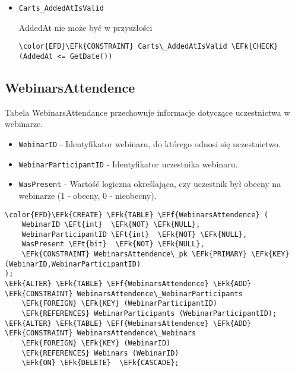 \documentclass[11pt]{article}
\newcommand{\EFk}[1]{\textcolor{EFk}{\textbf{#1}}} %
\newcommand{\EFf}[1]{\textcolor{EFf}{#1}} %
\newcommand{\EFt}[1]{\textcolor{EFt}{\textbf{#1}}} %
\begin{document}
\begin{itemize}
\item \texttt{Carts\_AddedAtIsValid}

AddedAt nie może być w przyszłości
\begin{Code}
\begin{Verbatim}
\color{EFD}\EFk{CONSTRAINT} Carts\_AddedAtIsValid \EFk{CHECK}
(AddedAt <= GetDate())
\end{Verbatim}
\end{Code}
\end{itemize}
\subsection{WebinarsAttendence}
\label{sec:org1fe8433}
Tabela WebinarsAttendance przechowuje informacje dotyczące uczestnictwa w webinarze.
\begin{itemize}
\item \texttt{WebinarID} - Identyfikator webinaru, do którego odnosi się uczestnictwo.
\item \texttt{WebinarParticipantID} - Identyfikator uczestnika webinaru.
\item \texttt{WasPresent} - Wartość logiczna określająca, czy uczestnik był obecny na webinarze (1 - obecny, 0 - nieobecny).
\end{itemize}
\begin{Code}
\begin{Verbatim}
\color{EFD}\EFk{CREATE} \EFk{TABLE} \EFf{WebinarsAttendence} (
    WebinarID \EFt{int}  \EFk{NOT} \EFk{NULL},
    WebinarParticipantID \EFt{int}  \EFk{NOT} \EFk{NULL},
    WasPresent \EFt{bit}  \EFk{NOT} \EFk{NULL},
    \EFk{CONSTRAINT} WebinarsAttendence\_pk \EFk{PRIMARY} \EFk{KEY}  (WebinarID,WebinarParticipantID)
);
\EFk{ALTER} \EFk{TABLE} \EFf{WebinarsAttendence} \EFk{ADD} \EFk{CONSTRAINT} WebinarsAttendence\_WebinarParticipants
    \EFk{FOREIGN} \EFk{KEY} (WebinarParticipantID)
    \EFk{REFERENCES} WebinarParticipants (WebinarParticipantID);
\EFk{ALTER} \EFk{TABLE} \EFf{WebinarsAttendence} \EFk{ADD} \EFk{CONSTRAINT} WebinarsAttendence\_Webinars
    \EFk{FOREIGN} \EFk{KEY} (WebinarID)
    \EFk{REFERENCES} Webinars (WebinarID)
    \EFk{ON} \EFk{DELETE}  \EFk{CASCADE};
\end{Verbatim}
\end{Code}
\end{document}
